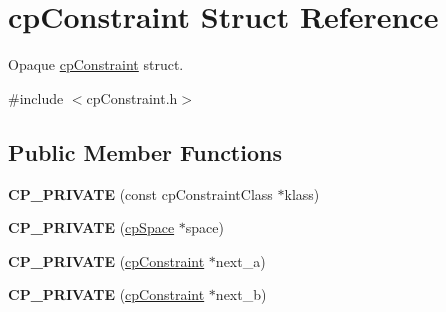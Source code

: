 \hypertarget{structcp_constraint}{\section{cp\-Constraint Struct Reference}
\label{structcp_constraint}
}


Opaque \hyperlink{structcp_constraint}{cp\-Constraint} struct.  




{\ttfamily \#include $<$cp\-Constraint.\-h$>$}

\subsection*{Public Member Functions}
\begin{DoxyCompactItemize}
\item 
\hypertarget{structcp_constraint_a44f5af613bf4c6e0511bc127d94aa78d}{{\bfseries C\-P\-\_\-\-P\-R\-I\-V\-A\-T\-E} (const cp\-Constraint\-Class $\ast$klass)}\label{structcp_constraint_a44f5af613bf4c6e0511bc127d94aa78d}

\item 
\hypertarget{structcp_constraint_aec1f02bf1958230e30c95bc18845556d}{{\bfseries C\-P\-\_\-\-P\-R\-I\-V\-A\-T\-E} (\hyperlink{structcp_space}{cp\-Space} $\ast$space)}\label{structcp_constraint_aec1f02bf1958230e30c95bc18845556d}

\item 
\hypertarget{structcp_constraint_a8d81403729c24f480946b45a7a66a7b4}{{\bfseries C\-P\-\_\-\-P\-R\-I\-V\-A\-T\-E} (\hyperlink{structcp_constraint}{cp\-Constraint} $\ast$next\-\_\-a)}\label{structcp_constraint_a8d81403729c24f480946b45a7a66a7b4}

\item 
\hypertarget{structcp_constraint_a0f9405946ef86a0be1ede8a6adb2b924}{{\bfseries C\-P\-\_\-\-P\-R\-I\-V\-A\-T\-E} (\hyperlink{structcp_constraint}{cp\-Constraint} $\ast$next\-\_\-b)}\label{structcp_constraint_a0f9405946ef86a0be1ede8a6adb2b924}

\end{DoxyCompactItemize}
